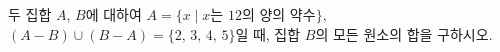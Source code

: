 두 집합 $A$, $B$에 대하여 $A=\{x \mid x$는 $12$의 양의 약수$\}$, $(A-B)\cup(B-A)=\{2,\,3,\,4,\,5\}$일 때, 집합 $B$의 모든 원소의 합을 구하시오.
